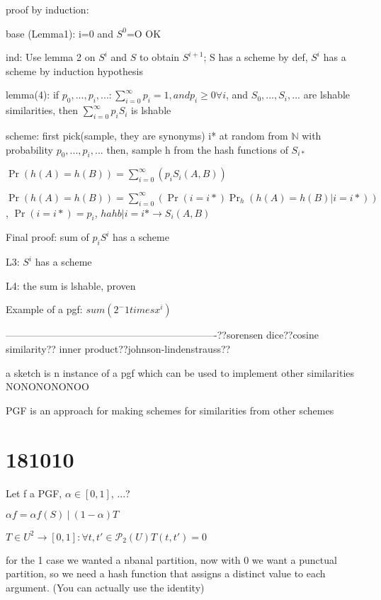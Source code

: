 \documentclass{report}
\begin{document}
	proof by induction:
	
	base (Lemma1): i=0 and $S^0$=O OK
	
	ind: Use lemma 2 on $S^i$ and $S$ to obtain $S^{i+1}$; S has a scheme by def, $S^i$ has a scheme by induction hypothesis
	
	
	lemma(4): if $p_0, ..., p_i, ... : \sum_{i=0}^{\infty}p_i=1 , and p_i\geq 0 \forall i$, and $S_0, ..., S_i, ...$ are lshable similarities, then $\sum_{i=0}^{\infty}p_iS_i$ is lshable
	
	scheme: first pick(sample, they are synonyms) i* at random from $\mathbb{N}$ with probability $p_0, ..., p_i, ...$
	then, sample h from the hash functions of $S_{i*}$
	
	$\Pr(h(A)=h(B))=\sum_{i=0}^{\infty}(p_i S_i(A, B))$
	
	$\Pr(h(A)=h(B))=\sum_{i=0}^{\infty}(\Pr(i=i*)\Pr_h(h(A)=h(B) | i=i*))$, $\Pr(i=i*) = p_i$, $hahb|i=i* \to S_i(A, B)$
	
	
	Final proof: sum of $p_iS^i$ has a scheme
	
	L3: $S^i$ has a scheme
	
	L4: the sum is lshable, proven
	
	
	Example of a pgf: $sum(2^-1 times x^i)$
	
	
	----------------------------------------------------------------??sorensen dice??cosine similarity?? inner product??johnson-lindenstrauss??
	
	a sketch is n instance of a pgf which can be used to implement other similarities NONONONONOO
	
	
	
	PGF is an approach for making schemes for similarities from other schemes
	
	\section{181010}
	
	Let f a PGF, $\alpha \in [0, 1]$, ...?
	
	$\alpha f = \alpha f(S)\ |\ (1 - \alpha)T$
	
	$T \in U^2 \to [0, 1] : \forall {t, t'} \in \mathcal{P}_2(U) T(t, t') = 0$
	
	for the 1 case we wanted a nbanal partition, now with 0 we want a punctual partition, so we need a hash function that assigns a distinct value to each argument. (You can actually use the identity)
	
\end{document}
